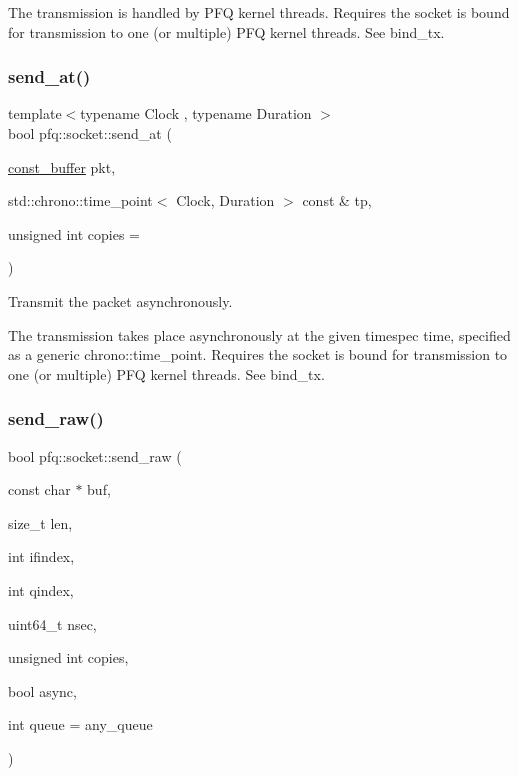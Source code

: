The transmission is handled by P\+FQ kernel threads. Requires the socket is bound for transmission to one (or multiple) P\+FQ kernel threads. See \textquotesingle{}bind\+\_\+tx\textquotesingle{}. \mbox{\label{classpfq_1_1socket_a730cae7c25a32b22cc79615cbf3f86aa}} 
\subsubsection{\texorpdfstring{send\+\_\+at()}{send\_at()}}
{\footnotesize\ttfamily template$<$typename Clock , typename Duration $>$ \\
bool pfq\+::socket\+::send\+\_\+at (\begin{DoxyParamCaption}\item[{\hyperlink{namespacepfq_ac835a1bd09b4cbaba61c100b50d0a99f}{const\+\_\+buffer}}]{pkt,  }\item[{std\+::chrono\+::time\+\_\+point$<$ Clock, Duration $>$ const \&}]{tp,  }\item[{unsigned int}]{copies = {} }\end{DoxyParamCaption})\hspace{0.3cm}{\ttfamily [inline]}}

Transmit the packet asynchronously.

The transmission takes place asynchronously at the given timespec time, specified as a generic chrono\+::time\+\_\+point. Requires the socket is bound for transmission to one (or multiple) P\+FQ kernel threads. See \textquotesingle{}bind\+\_\+tx\textquotesingle{}. \mbox{\label{classpfq_1_1socket_a577512e9c6241ea233c867da14c0e9ae}} 
\subsubsection{\texorpdfstring{send\+\_\+raw()}{send\_raw()}}
{\footnotesize\ttfamily bool pfq\+::socket\+::send\+\_\+raw (\begin{DoxyParamCaption}\item[{const char $\ast$}]{buf,  }\item[{size\+\_\+t}]{len,  }\item[{int}]{ifindex,  }\item[{int}]{qindex,  }\item[{uint64\+\_\+t}]{nsec,  }\item[{unsigned int}]{copies,  }\item[{bool}]{async,  }\item[{int}]{queue = {\ttfamily any\+\_\+queue} }\end{DoxyParamCaption})\hspace{0.3cm}{\ttfamily [inline]}}



